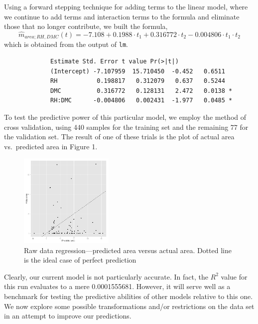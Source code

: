 \documentclass{article}
\begin{document}
Using a forward stepping technique for adding terms to the linear model, where
we continue to add terms and interaction terms to the formula and eliminate
those that no longer contribute, we built the formula,
\begin{equation}
  \widehat{m}_{area;RH,DMC}(t) = -7.108 + 0.1988 \cdot t_1 + 0.316772 \cdot t_2
  - 0.004806 \cdot t_1 \cdot t_2
\end{equation}
which is obtained from the output of \verb=lm=.

\begin{verbatim}
             Estimate Std. Error t value Pr(>|t|)  
             (Intercept) -7.107959  15.710450  -0.452   0.6511  
             RH           0.198817   0.312079   0.637   0.5244  
             DMC          0.316772   0.128131   2.472   0.0138 *
             RH:DMC      -0.004806   0.002431  -1.977   0.0485 *
\end{verbatim}

To test the predictive power of this particular model, we employ the method of
cross validation, using 440 samples for the training set and the remaining 77
for the validation set. The result of one of these trials is the plot of actual
area vs.\ predicted area in Figure 1.

\begin{figure}[htb]
  \centering
  \includegraphics[width=0.4\textwidth]{figures/firenaivepredict.png}
  \caption{Raw data regression---predicted area versus actual area. Dotted line
  is the ideal case of perfect prediction}
\end{figure}

Clearly, our current model is not particularly accurate. In fact, the $R^2$
value for this run evaluates to a mere 0.0001555681. However, it will serve
well as a benchmark for testing the predictive abilities of other models
relative to this one. We now explore some possible transformations and/or
restrictions on the data set in an attempt to improve our predictions.
\end{document}
